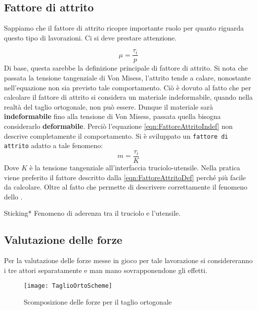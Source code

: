 \subsection{Fattore di attrito}
Sappiamo che il fattore di attrito ricopre importante ruolo per quanto riguarda questo tipo
di lavorazioni. Ci si deve prestare attenzione.

\begin{equation}
\mu = \frac{\tau_i}{p}
\label{eqn:FattoreAttritoIndef}
\end{equation}
Di base, questa sarebbe la definizione principale di fattore di attrito.
Si nota che passata la tensione tangenziale di Von Misess, 
l'attrito tende a calare, nonostante nell'equazione non sia previsto tale 
comportamento.
Ciò è dovuto al fatto che per calcolare il fattore di attrito si considera un materiale
indeformabile, quando nella realtà del taglio ortogonale, non può essere.
Dunque il materiale sarà \textbf{indeformabile} fino alla tensione di Von Misess, 
passata quella bisogna considerarlo \textbf{deformabile}.
Perciò l'equazione \eqref{eqn:FattoreAttritoIndef} non descrive completamente il comportamento.
Si è sviluppato un \texttt{fattore di attrito} adatto a tale fenomeno:
\begin{equation}
m = \frac{\tau_i}{K}
\label{eqn:FattoreAttritoDef}
\end{equation}
Dove $K$ è la tensione tangenziale all'interfaccia truciolo-utensile.
Nella pratica viene preferito il fattore descritto dalla \eqref{eqn:FattoreAttritoDef} 
perché più facile da calcolare. Oltre al fatto che permette di descrivere correttamente
il fenomeno dello .

\begin{definition}{Sticking}{*}
Fenomeno di aderenza tra il truciolo e l'utensile. 
\end{definition}

\subsection{Valutazione delle forze}
Per la valutazione delle forze messe in gioco per tale lavorazione si considereranno
i tre attori separatamente e man mano sovrapponendone gli effetti.

\begin{figure}
\centering
\texttt{[image: TaglioOrtoScheme]}
\caption{Scomposizione delle forze per il taglio ortogonale}
\label{fig:TaglioOrtoForces}
\end{figure}

